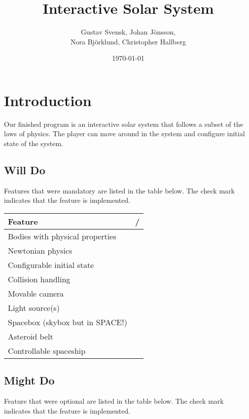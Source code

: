 \documentclass[a4paper,12pt]{article} \usepackage{graphicx}
\title{Interactive Solar System}
\author{Gustav Svensk, Johan Jönsson, \\
    Nora Björklund, Christopher Hallberg}
\date{\today}
\newcommand{\cmark}{\ding{51}}%
\newcommand{\xmark}{\ding{55}}%
\begin{document}
\maketitle
{}
\tableofcontents
\newpage
\section{Introduction}
Our finished program is an interactive solar system that follows a subset of 
the laws of physics. The player can move around in the system and configure
initial state of the system.

\subsection{Will Do}
Features that were mandatory are listed in the table below. The check mark
indicates that the feature is implemented.
\begin{center}
        \begin{tabular}{|l|c|}
                \hline
                \textbf{Feature} & \cmark/\xmark \\
                \hline
                Bodies with physical properties & \cmark \\
                Newtonian physics & \cmark \\
                Configurable initial state & \cmark \\
                Collision handling & \cmark \\
                Movable camera & \cmark \\
                Light source(s) & \cmark \\
                Spacebox (skybox but in SPACE!) & \cmark \\
                Asteroid belt & \cmark \\
                Controllable spaceship & \cmark \\
                \hline

        \end{tabular}
\end{center}

\subsection{Might Do}
Feature that were optional are listed in the table below. The check mark
indicates that the feature is implemented.
\end{document}
